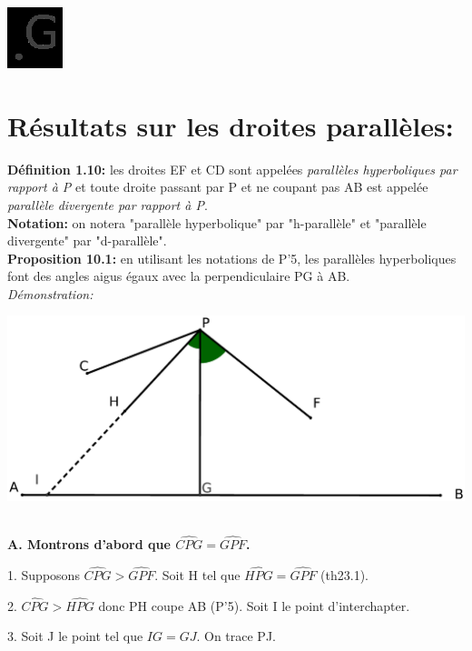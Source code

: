 \documentclass[a4paper, 12pt, twoside]{book}
\begin{document}
 
  
  
  \includegraphics[scale=0.5]{figures/Lobat1.eps}\
  
   \section{Résultats sur les droites parallèles:}
  
  \textbf{Définition 1.10:} les droites EF et CD sont appelées \textit{parallèles hyperboliques par rapport à P} et toute droite passant par P et ne coupant pas AB est appelée \textit{parallèle divergente par rapport à P}.\\
  
   
  \textbf{Notation:} on notera "parallèle hyperbolique" par  "h-parallèle" et "parallèle divergente" par "d-parallèle".\\
  
   \textbf{Proposition 10.1:} en utilisant les notations de P'5, les parallèles hyperboliques font des angles aigus égaux avec la perpendiculaire PG à AB.\\
   
   \textit{Démonstration:} 
   
    \includegraphics[scale=0.2]{figures/Lobat3.eps}\
    
    \textbf{A. Montrons d'abord que $\hat{CPG}=\hat{GPF}$.}
    
    1. Supposons  $\hat{CPG}>\hat{GPF}$. Soit H tel que $\hat{HPG}=\hat{GPF}$ (th23.1).\
    
    2. $\hat{CPG}>\hat{HPG}$ donc PH coupe AB (P'5). Soit I le point d'interchapter.\
    
    3. Soit J le point tel que $IG=GJ$. On trace PJ.\\
    
\end{document}
